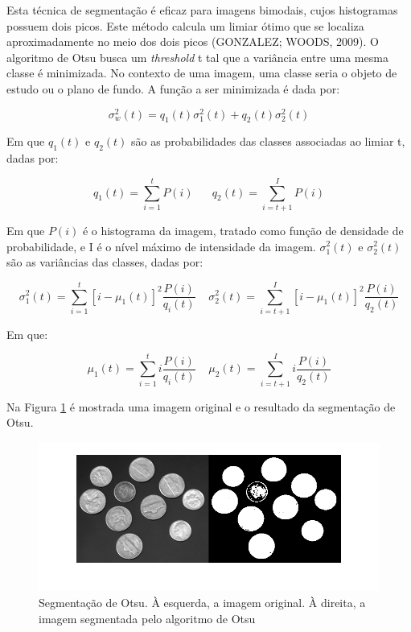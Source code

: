 Esta técnica de segmentação é eficaz para imagens bimodais, cujos histogramas possuem dois picos. Este método calcula um limiar ótimo que se localiza aproximadamente no meio dos dois picos (GONZALEZ; WOODS, 2009). O algoritmo de Otsu busca um \textit{threshold} t tal que a variância entre uma mesma classe é minimizada. No contexto de uma imagem, uma classe seria o objeto de estudo ou o plano de fundo. A função a ser minimizada é dada por:

\begin{equation} \label{eq:otsu}
	\sigma_w^2(t) = q_1(t)\sigma_1^2(t) + q_2(t)\sigma_2^2(t)
\end{equation}

Em que $q_1(t)$ e $q_2(t)$ são as probabilidades das classes associadas ao limiar t, dadas por:

\begin{equation}
	q_1(t) = \sum_{i=1}^t{P(i)} \;\;\;\;\;\; q_2(t) = \sum_{i=t+1}^I{P(i)}
\end{equation}

Em que $P(i)$ é o histograma da imagem, tratado como função de densidade de probabilidade, e I é o nível máximo de intensidade da imagem. $\sigma_1^2(t)$ e $\sigma_2^2(t)$ são as variâncias das classes, dadas por:

\begin{equation}
	\sigma_1^2(t) = \sum_{i=1}^t{[i-\mu_1(t)]^2\frac{P(i)}{q_i(t)}} \;\;\;\; \sigma_2^2(t) = \sum_{i=t+1}^I{[i-\mu_1(t)]^2\frac{P(i)}{q_2(t)}}
\end{equation}

Em que:

\begin{equation}
	\mu_1(t) = \sum_{i=1}^t{i\frac{P(i)}{q_i(t)}} \;\;\;\; \mu_2(t) = \sum_{i=t+1}^I{i\frac{P(i)}{q_2(t)}}
\end{equation}

Na Figura \ref{fig:otsu} é mostrada uma imagem original e o resultado da segmentação de Otsu.

\begin{figure}[H]
\centering
    \caption{\label{fig:otsu} Segmentação de Otsu. À esquerda, a imagem original. À direita, a imagem segmentada pelo algoritmo de Otsu}
    \includegraphics[scale=0.5]{img/otsu.png}
\end{figure}

